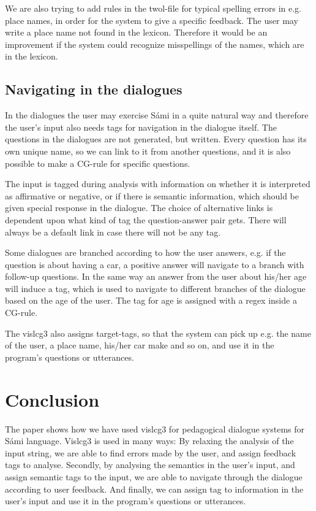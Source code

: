 \documentclass[11pt]{article}
\begin{document}
We are also trying to add rules in the twol-file for typical spelling errors in e.g. place names, in order for the system to give a specific feedback. The user may write a place name not found in the lexicon. Therefore it would be an improvement if the system could recognize misspellings of the names, which are in the lexicon.

\subsection{Navigating in the dialogues}
In the dialogues the user may exercise Sámi in a quite natural way and therefore the user's input also needs tags for navigation in the dialogue itself. The questions in the dialogues are not generated, but written. Every question has its own unique name, so we can link to it from another questions, and it is also possible to make a CG-rule for specific questions.   

The input is tagged during analysis with information on whether it is interpreted as affirmative or negative, or if there is semantic information, which should be given special response in the dialogue. The choice of alternative links is dependent upon what kind of tag the question-answer pair gets. There will always be a default link in case there will not be any tag. 
 
Some dialogues are branched according to how the user answers, e.g. if the question is about having a car, a positive answer will navigate to a branch with follow-up questions. In the same way an answer from the user about his/her age will induce a tag, which is used to navigate to different branches of the dialogue based on the age of the user. The tag for age is assigned with a regex inside a CG-rule.

The vislcg3 also assigns target-tags, so that the system can pick up e.g. the name of the user, a place name, his/her car make and so on, and use it in the program's questions or utterances.
 
\section{Conclusion}
The paper shows how we have used vislcg3 for pedagogical dialogue systems for Sámi language. Vislcg3 is used in many ways: By relaxing the analysis of the input string, we are able to find errors made by the user, and assign feedback tags to analyse. Secondly, by analysing the semantics in the user's input, and assign semantic tags to the input, we are able to navigate through the dialogue according to user feedback. And finally, we can assign tag to information in the user's input and use it in the program's questions or utterances.  
\end{document}
